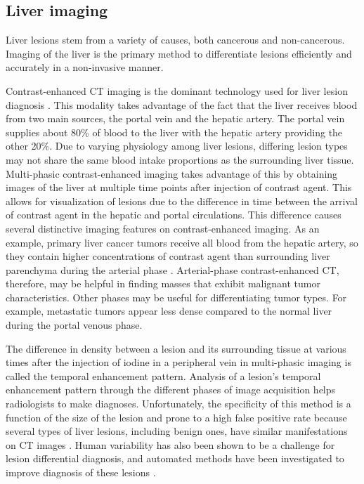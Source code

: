 \subsection{Liver imaging}
Liver lesions stem from a variety of causes, both cancerous and non-cancerous. Imaging of the liver is the primary method to differentiate lesions efficiently and accurately in a non-invasive manner.

Contrast-enhanced CT imaging is the dominant technology used for liver lesion diagnosis \cite{Baron:1994vg}. This modality takes advantage of the fact that the liver receives blood from two main sources, the portal vein and the hepatic artery. The portal vein supplies about 80\% of blood to the liver with the hepatic artery providing the other 20\%. Due to varying physiology among liver lesions, differing lesion types may not share the same blood intake proportions as the surrounding liver tissue. Multi-phasic contrast-enhanced imaging takes advantage of this by obtaining images of the liver at multiple time points after injection of contrast agent. This allows for visualization of lesions due to the difference in time between the arrival of contrast agent in the hepatic and portal circulations. This difference causes several distinctive imaging features on contrast-enhanced imaging. As an example, primary liver cancer tumors receive all blood from the hepatic artery, so they contain higher concentrations of contrast agent than surrounding liver parenchyma during the arterial phase \cite{Lautt:1987wma,Matsui:1991vba}. Arterial-phase contrast-enhanced CT, therefore, may be helpful in finding masses that exhibit malignant tumor characteristics. Other phases may be useful for differentiating tumor types. For example, metastatic tumors appear less dense compared to the normal liver during the portal venous phase.

The difference in density between a lesion and its surrounding tissue at various times after the injection of iodine in a peripheral vein in multi-phasic imaging is called the temporal enhancement pattern. Analysis of a lesion's temporal enhancement pattern through the different phases of image acquisition helps radiologists to make diagnoses. Unfortunately, the specificity of this method is a function of the size of the lesion and prone to a high false positive rate because several types of liver lesions, including benign ones, have similar manifestations on CT images \cite{Lencioni:2005ia}. Human variability has also been shown to be a challenge for lesion differential diagnosis, and automated methods have been investigated to improve diagnosis of these lesions \cite{Armato:2007ks}.



